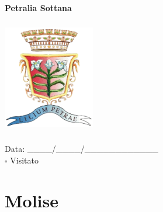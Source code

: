 \documentclass[a5paper,12pt]{article}
\begin{document}
\newpage

\noindent
\begin{minipage}[t]{0.45\textwidth}
    \begin{center}
        \textbf{Petralia Sottana}
    \end{center}
    \vspace{-0.5cm} %
    \begin{center}
        \includegraphics[height= 5cm, width=4cm]{Sicilia/Petralia_Sottana-Stemma.png}
    \end{center}
    \vspace{-0.4cm} %
    \begin{flushleft}
        Data: \_\_\_\_/\_\_\_\_/\_\_\_\_\_\_\_\_\_\_\_\_ \\
        $\square$ Visitato
    \end{flushleft}
\end{minipage}
\hfill
\begin{minipage}[t]{0.45\textwidth}
\end{minipage}

\newpage

\section*{Molise}

\newpage
\end{document}
